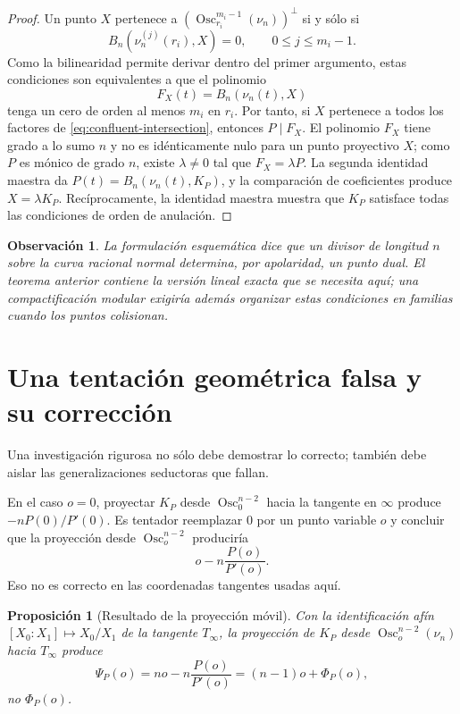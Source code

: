 \documentclass[11pt,oneside]{scrartcl}
\theoremstyle{plainblue}
\newtheorem{proposition}[theorem]{Proposición}
\theoremstyle{definitionblue}
\theoremstyle{remarkgray}
\newtheorem{remark}[theorem]{Observación}
\newcommand{\Osc}{\operatorname{Osc}}
\begin{document}
\begin{proof}
Un punto \(X\) pertenece a
\(\left(\Osc_{r_i}^{m_i-1}(\nu_n)\right)^\perp\) si y sólo si
\[
B_n(\nu_n^{(j)}(r_i),X)=0,
\qquad 0\le j\le m_i-1.
\]
Como la bilinearidad permite derivar dentro del primer argumento, estas condiciones
son equivalentes a que el polinomio
\[
F_X(t)=B_n(\nu_n(t),X)
\]
tenga un cero de orden al menos \(m_i\) en \(r_i\). Por tanto, si \(X\) pertenece
a todos los factores de \cref{eq:confluent-intersection}, entonces \(P\mid F_X\).
El polinomio \(F_X\) tiene grado a lo sumo \(n\) y no es idénticamente nulo para un
punto proyectivo \(X\); como \(P\) es mónico de grado \(n\), existe
\(\lambda\ne0\) tal que \(F_X=\lambda P\). La segunda identidad maestra da
\(P(t)=B_n(\nu_n(t),K_P)\), y la comparación de coeficientes produce
\(X=\lambda K_P\). Recíprocamente, la identidad maestra muestra que \(K_P\)
satisface todas las condiciones de orden de anulación.
\end{proof}

\begin{remark}
La formulación esquemática dice que un divisor de longitud \(n\) sobre la curva
racional normal determina, por apolaridad, un punto dual. El teorema anterior contiene
la versión lineal exacta que se necesita aquí; una compactificación modular exigiría
además organizar estas condiciones en familias cuando los puntos colisionan.
\end{remark}

\section{Una tentación geométrica falsa y su corrección}

Una investigación rigurosa no sólo debe demostrar lo correcto; también debe aislar
las generalizaciones seductoras que fallan.

En el caso \(o=0\), proyectar \(K_P\) desde \(\Osc_0^{n-2}\) hacia la tangente en
\(\infty\) produce \(-nP(0)/P'(0)\). Es tentador reemplazar \(0\) por un punto
variable \(o\) y concluir que la proyección desde \(\Osc_o^{n-2}\) produciría
\[
o-n\frac{P(o)}{P'(o)}.
\]
Eso no es correcto en las coordenadas tangentes usadas aquí.

\begin{proposition}[Resultado de la proyección móvil]\label{prop:false-generalization}
Con la identificación afín \([X_0:X_1]\mapsto X_0/X_1\) de la tangente
\(T_\infty\), la proyección de \(K_P\) desde \(\Osc_o^{n-2}(\nu_n)\) hacia
\(T_\infty\) produce
\begin{equation}\label{eq:moving-projection}
\Psi_P(o)=no-n\frac{P(o)}{P'(o)}
=(n-1)o+\Phi_P(o),
\end{equation}
no \(\Phi_P(o)\).
\end{proposition}
\end{document}
